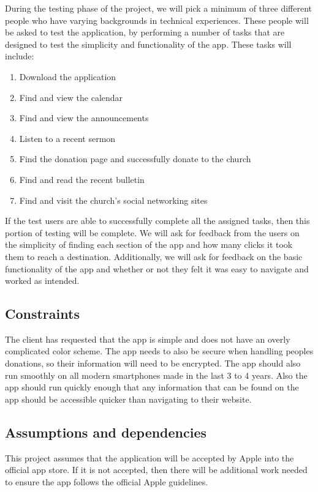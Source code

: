 \documentclass[letterpaper,10pt,draftclsnofoot,onecolumn,compsoc,titlepage]{IEEEtran}
\begin{document}
	During the testing phase of the project, we will pick a minimum of three different people who have varying backgrounds in technical experiences. 
	These people will be asked to test the application, by performing a number of tasks that are designed to test the simplicity and functionality of the app. 
	These tasks will include: 
	\begin{enumerate}
		\item{Download the application}
		\item{Find and view the calendar}
		\item{Find and view the announcements}
		\item{Listen to a recent sermon}
		\item{Find the donation page and successfully donate to the church}
		\item{Find and read the recent bulletin}
		\item{Find and visit the church's social networking sites}
	\end{enumerate}
	If the test users are able to successfully complete all the assigned tasks, then this portion of testing will be complete. 
	We will ask for feedback from the users on the simplicity of finding each section of the app and how many clicks it took them to reach a destination.
	Additionally, we will ask for feedback on the basic functionality of the app and whether or not they felt it was easy to navigate and worked as intended.

	\subsection{Constraints}
	The client has requested that the app is simple and does not have an overly complicated color scheme.
	The app needs to also be secure when handling peoples donations, so their information will need to be encrypted.
	The app should also run smoothly on all modern smartphones made in the last 3 to 4 years.
	Also the app should run quickly enough that any information that can be found on the app should be accessible quicker than navigating to their website.

	\subsection{Assumptions and dependencies}
	This project assumes that the application will be accepted by Apple into the official app store.
	If it is not accepted, then there will be additional work needed to ensure the app follows the official Apple guidelines.
\end{document}
